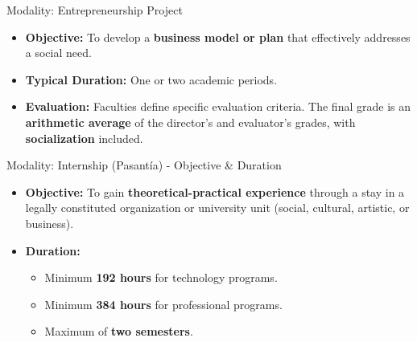     \begin{frame}{Modality: Entrepreneurship Project}
      \begin{itemize}
        \item<1-> \textbf{Objective:} To develop a \textbf{business model or plan} that effectively addresses a social need.
        \item<2-> \textbf{Typical Duration:} One or two academic periods.
        \item<3-> \textbf{Evaluation:} Faculties define specific evaluation criteria. The final grade is an \textbf{arithmetic average} of the director's and evaluator's grades, with \textbf{socialization} included.
      \end{itemize}
    \end{frame}


      \begin{frame}{Modality: Internship (Pasantía) - Objective \& Duration}
        \begin{itemize}
          \item<1-> \textbf{Objective:} To gain \textbf{theoretical-practical experience} through a stay in a legally constituted organization or university unit (social, cultural, artistic, or business).
          \item<2-> \textbf{Duration:}
            \begin{itemize}
              \item<3-> Minimum \textbf{192 hours} for technology programs.
              \item<4-> Minimum \textbf{384 hours} for professional programs.
              \item<5-> Maximum of \textbf{two semesters}.
            \end{itemize}
        \end{itemize}
      \end{frame}

